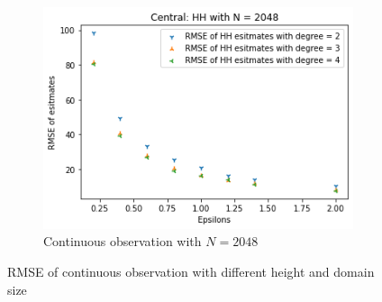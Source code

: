\documentclass[11pt]{article}
\theoremstyle{definition}
\begin{document}
\begin{figure}[H]
\begin{subfigure}[b]{0.3\textwidth}
         \centering
         \includegraphics[width=\textwidth]{figures/hh_cen_epsi/hh_N=2048.png}
         \caption{Continuous observation with $N=2048$}
         \label{fig:c}
     \end{subfigure}
        \caption{RMSE of continuous observation with different height and domain size}
        \label{fig:esp_cen_hh}
\end{figure}
\end{document}

